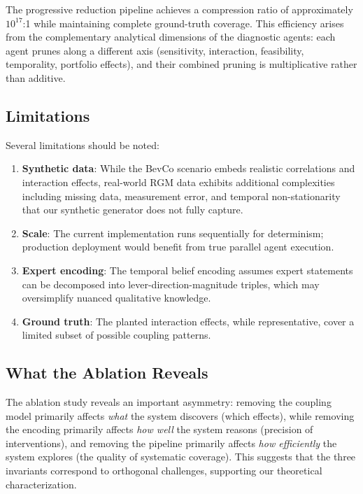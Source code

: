 \documentclass[11pt,a4paper]{article}
\begin{document}
The progressive reduction pipeline achieves a compression ratio of approximately $10^{17}$:1 while maintaining complete ground-truth coverage.
This efficiency arises from the complementary analytical dimensions of the diagnostic agents: each agent prunes along a different axis (sensitivity, interaction, feasibility, temporality, portfolio effects), and their combined pruning is multiplicative rather than additive.

\subsection{Limitations}

Several limitations should be noted:
\begin{enumerate}
    \item \textbf{Synthetic data}: While the BevCo scenario embeds realistic correlations and interaction effects, real-world RGM data exhibits additional complexities including missing data, measurement error, and temporal non-stationarity that our synthetic generator does not fully capture.
    \item \textbf{Scale}: The current implementation runs sequentially for determinism; production deployment would benefit from true parallel agent execution.
    \item \textbf{Expert encoding}: The temporal belief encoding assumes expert statements can be decomposed into lever-direction-magnitude triples, which may oversimplify nuanced qualitative knowledge.
    \item \textbf{Ground truth}: The planted interaction effects, while representative, cover a limited subset of possible coupling patterns.
\end{enumerate}

\subsection{What the Ablation Reveals}

The ablation study reveals an important asymmetry: removing the coupling model primarily affects \emph{what} the system discovers (which effects), while removing the encoding primarily affects \emph{how well} the system reasons (precision of interventions), and removing the pipeline primarily affects \emph{how efficiently} the system explores (the quality of systematic coverage).
This suggests that the three invariants correspond to orthogonal challenges, supporting our theoretical characterization.
\end{document}

